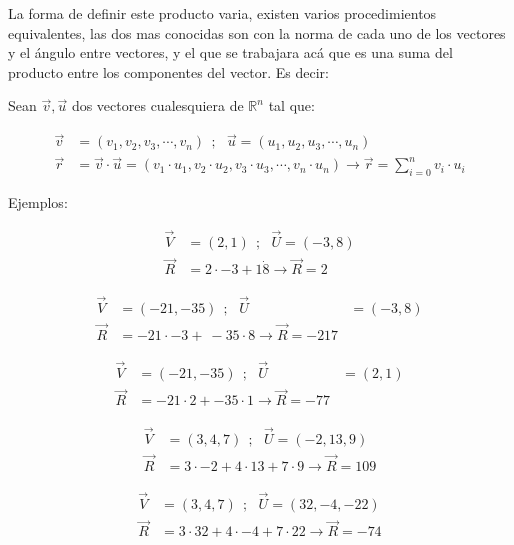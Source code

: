     La forma de definir este producto varia, existen varios procedimientos
    equivalentes, las dos mas conocidas son con la norma de cada uno de los vectores
    y el ángulo entre vectores, y el que se trabajara acá que es una suma del
    producto entre los componentes del vector. Es decir:

    Sean $\vec{v},\vec{u}$ dos vectores cualesquiera de $\mathbb{R}^n$ tal que:

    \begin{align*}
        \vec{v}&=(v_1,v_2,v_3,\cdots,v_n) \ \ ;\ \ \ \vec{u}=(u_1,u_2,u_3,\cdots,u_n)\\
        \vec{r}&=\vec{v}\cdot\vec{u}= (v_1\cdot u_1,v_2 \cdot u_2,v_3 \cdot u_3,\cdots,v_n \cdot u_n)\rightarrow
        \vec{r}= \sum_{i=0}^{n} v_i\cdot u_i
    \end{align*}


    Ejemplos:

    \begin{align*}
        \vec{V}& =(2,1) \ \ ;\ \ \  \vec{U} =(-3,8)		\\
        \vec{R}&= 2\cdot-3 +1\dot8   \rightarrow \vec{R}= 2
    \end{align*}

    \begin{align*}
        \vec{V}& =(-21,-35)  \ \ ;\ \ \  \vec{U} &=(-3,8)		\\
        \vec{R}&= -21\cdot-3 +\ -35\cdot8    \rightarrow \vec{R}= -217
    \end{align*}

    \begin{align*}
        \vec{V}& =(-21,-35)  \ \ ;\ \ \ \vec{U} &=(2,1)		\\
        \vec{R}&= -21\cdot2 + -35\cdot1   \rightarrow \vec{R}= -77
    \end{align*}




    \begin{align*}
        \vec{V}& =(3,4,7)   \ \ ;\ \ \  \vec{U} =(-2,13,9)		\\
        \vec{R}&= 3\cdot-2 +4\cdot13 +7\cdot9   \rightarrow \vec{R} = 109
    \end{align*}

    \begin{align*}
        \vec{V}& =(3,4,7)  \ \ ;\ \ \  \vec{U} =(32,-4,-22)		\\
        \vec{R}&= 3\cdot32 + 4\cdot-4 +7\cdot22    \rightarrow \vec{R} = -74
    \end{align*}

